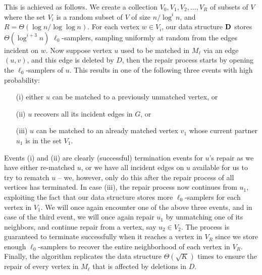 \documentclass[11pt,a4paper]{article}
\newcommand{\D}{\mathsf{\bf D}}
\begin{document}
This is achieved as follows. %
We create a collection $V_0, V_1, V_2, \dots, V_R$ of subsets of $V$ where the set $V_i$ is a random subset of $V$ of size $n/\log^i n$, and $R = \Theta(\log n / \log \log n)$. For each vertex $w \in V_i$, our data structure $\D$ stores $\Theta(\log^{i+3} n)$ $\ell_0$-samplers, sampling uniformly at random from the edges incident on $w$. Now suppose vertex $u$ used to be matched in $M_{\ell}$ via an edge $(u,v)$, and this edge is deleted by $D$, then the repair process starts by opening the $\ell_0$-samplers of $u$. This results in one of the following three events with high probability: 

\begin{itemize}
    \item[(i)] either $u$ can be matched to a previously unmatched vertex, or 
    \item [(ii)] $u$ recovers all its incident edges in $G$, or 
    \item [(iii)] $u$ can be matched to an already matched vertex $v_1$ whose current partner $u_1$ is in the set $V_1$.
\end{itemize}
 Events (i) and (ii) are clearly (successful) termination events for $u$'s repair as we have either re-matched $u$, or we have all incident edges on $u$ available for us to try to rematch $u$ -- we, however, only do this after the repair process of all vertices has terminated. In case (iii), the repair process now continues from $u_1$, exploiting the fact that our data structure stores more $\ell_0$-samplers for each vertex in $V_1$. We will once again encounter one of the above three events, and in case of the third event, we will once again repair $u_1$ by unmatching one of its neighbors, and continue repair from a vertex, say $u_2 \in V_2$.  The process is guaranteed to terminate successfully when it reaches a vertex in $V_R$ since we store enough $\ell_0$-samplers to recover the entire neighborhood of each vertex in $V_R$. 
Finally, the algorithm replicates the data structure $\Theta(\sqrt{K})$ times to ensure the repair of every vertex in $M_{\ell}$ that is affected by deletions in $D$. 







\iffalse
Also, let $M_1, M_2. ..., M_{\ell}$ be a sequence of hierarchical matchings constructed using only edges in $I$, processed in an arbitrary order. Then let $M$ be any matching that for every vertex $v$ matched in $M_{\ell}$, the matching $M$ either (i) matches $v$ using some edge in $E$, or (ii) has the property that for all edges $(u,v) \in E$, the end-point $u$ is matched in $M$. Then $M$ can be extended to become a maximal matching of the graph $G(V,E)$ by simply greedily adding to it edges in $(M_1 \cup M_2 \cup ... M_{\ell-1}) \setminus D$.
\fi
\end{document}
